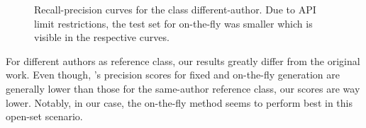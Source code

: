 \begin{figure}[htbp]
  \centering
  \begin{subfigure}[b]{0.495\textwidth}
    \centering
    
    \caption{\dataBlog{}}
    \label{fig:blog_different_author}
  \end{subfigure}
  \hfill
  \begin{subfigure}[b]{0.495\textwidth}
    \centering
    
    \caption{\dataStudent{}}
    \label{fig:student_essays_different_author}
  \end{subfigure}
  \caption{Recall-precision curves for the class different-author. Due to API limit restrictions, the test set for on-the-fly was smaller which is visible in the respective curves.}
  \label{fig:different_authors}
\end{figure}

For different authors as reference class, our results greatly differ from the original work.
Even though, \citet{koppel_determining_2014}'s precision scores for fixed and on-the-fly \imp{} generation are generally lower than those for the same-author reference class, our scores are way lower.
Notably, in our case, the on-the-fly method seems to perform best in this open-set scenario.
